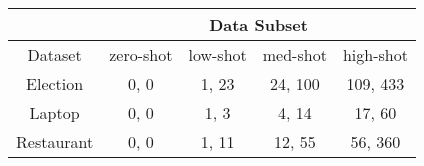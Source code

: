 \begin{tabular}{|c|c|c|c|c|}
\hline
        & \multicolumn{4}{c|}{Data Subset} \\
\hline
Dataset &     zero-shot &   low-shot &     med-shot &  high-shot \\
\hline
Election   &  0, 0 &  1, 23 &  24, 100 &   109, 433 \\
\hline
Laptop     &    0, 0 &   1, 3 &    4, 14 &   17, 60 \\
\hline
Restaurant &    0, 0 &  1, 11 &   12, 55 &   56, 360 \\
\hline
\end{tabular}